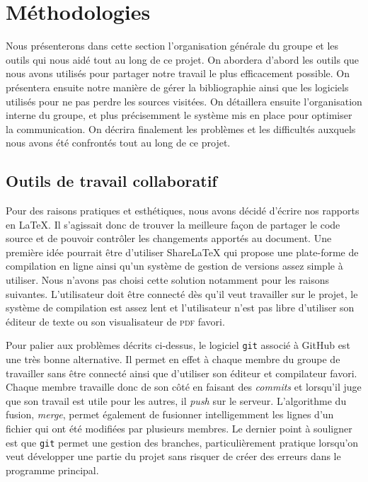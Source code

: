 


\section{Méthodologies}
Nous présenterons dans cette section l'organisation générale du groupe et les outils qui nous aidé tout au long de ce projet.
On abordera d'abord les outils que nous avons utilisés pour partager 
notre travail le plus efficacement possible.
On présentera ensuite notre manière de gérer la bibliographie
ainsi que les logiciels utilisés pour ne pas perdre les sources visitées.
On détaillera ensuite l'organisation interne du groupe, et
plus précisemment le système mis en place pour optimiser la communication.
On décrira finalement les problèmes et les difficultés auxquels nous avons été confrontés tout au long de ce projet.


\subsection{Outils de travail collaboratif}
Pour des raisons pratiques et esthétiques, nous avons décidé d'écrire
nos rapports en \LaTeX{}.
Il s'agissait donc de trouver la meilleure façon de partager le code source
et de pouvoir contrôler les changements apportés au document.
Une première idée pourrait être d'utiliser ShareLaTeX qui propose une plate-forme
de compilation en ligne ainsi qu'un système de gestion de versions
assez simple à utiliser.
Nous n'avons pas choisi cette solution notamment pour les raisons suivantes.
L'utilisateur doit être connecté dès qu'il veut travailler sur le projet,
le système de compilation est assez lent et l'utilisateur n'est pas libre
d'utiliser son éditeur de texte ou son visualisateur de \textsc{pdf} favori.

Pour palier aux problèmes décrits ci-dessus, le logiciel \texttt{git}
associé à GitHub est une très bonne alternative.
Il permet en effet à chaque membre du groupe de travailler sans être connecté
ainsi que d'utiliser son éditeur et compilateur favori.
Chaque membre travaille donc de son côté en faisant des \emph{commits}
et lorsqu'il juge que son travail est utile pour les autres, 
il \emph{push} sur le serveur.
L'algorithme du fusion, \emph{merge}, permet également de fusionner intelligemment
les lignes d'un fichier qui ont été modifiées par plusieurs membres.
Le dernier point à souligner est que \texttt{git} permet une gestion des branches,
particulièrement pratique lorsqu'on veut développer une partie du projet
sans risquer de créer des erreurs dans le programme principal.

